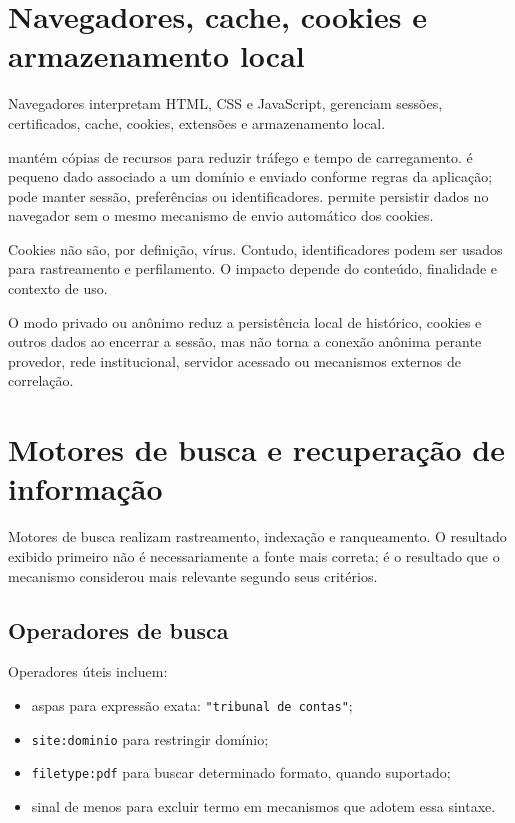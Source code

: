 \section{Navegadores, cache, cookies e armazenamento local}

Navegadores interpretam HTML, CSS e JavaScript, gerenciam sessões, certificados, cache, cookies, extensões e armazenamento local.

 mantém cópias de recursos para reduzir tráfego e tempo de carregamento.  é pequeno dado associado a um domínio e enviado conforme regras da aplicação; pode manter sessão, preferências ou identificadores.  permite persistir dados no navegador sem o mesmo mecanismo de envio automático dos cookies.

Cookies não são, por definição, vírus. Contudo, identificadores podem ser usados para rastreamento e perfilamento. O impacto depende do conteúdo, finalidade e contexto de uso.

O modo privado ou anônimo reduz a persistência local de histórico, cookies e outros dados ao encerrar a sessão, mas não torna a conexão anônima perante provedor, rede institucional, servidor acessado ou mecanismos externos de correlação.

\section{Motores de busca e recuperação de informação}

Motores de busca realizam rastreamento, indexação e ranqueamento. O resultado exibido primeiro não é necessariamente a fonte mais correta; é o resultado que o mecanismo considerou mais relevante segundo seus critérios.

\subsection{Operadores de busca}

Operadores úteis incluem:
\begin{itemize}
\item aspas para expressão exata: \texttt{"tribunal de contas"};
\item \texttt{site:dominio} para restringir domínio;
\item \texttt{filetype:pdf} para buscar determinado formato, quando suportado;
\item sinal de menos para excluir termo em mecanismos que adotem essa sintaxe.
\end{itemize}

